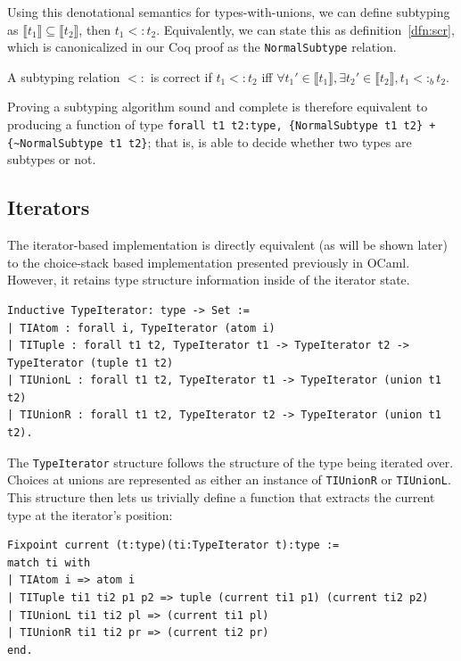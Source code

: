 \documentclass[a4paper,english]{lipics-v2018}
\newcommand{\denotes}[1]{\llbracket #1 \rrbracket}
\newcommand{\bsub}{<:_b}
\begin{document}
Using this denotational semantics for types-with-unions, we can define
subtyping as $\denotes{t_1} \subseteq \denotes{t_2}$, then $t_1 <: t_2$.
Equivalently, we can state this as definition~\ref{dfn:scr}, which is canonicalized
in our Coq proof as the \verb|NormalSubtype| relation.

\begin{definition}
A subtyping relation $<:$ is correct if $t_1 <: t_2$ iff $\forall t_1' \in \denotes{t_1},
\exists t_2' \in \denotes{t_2}, t_1 \bsub t_2$.
\label{dfn:scr}
\end{definition}

Proving a subtyping algorithm sound and complete is therefore equivalent to
producing a function of type \verb|forall t1 t2:type, {NormalSubtype t1 t2} + {~NormalSubtype t1 t2}|; that is, is able to decide whether two types are
subtypes or not.

\subsection{Iterators}

The iterator-based implementation is directly equivalent (as will be shown
later) to the choice-stack based implementation presented previously in OCaml.
However, it retains type structure information inside of the iterator state.

\begin{small}\begin{verbatim}
Inductive TypeIterator: type -> Set :=
| TIAtom : forall i, TypeIterator (atom i)
| TITuple : forall t1 t2, TypeIterator t1 -> TypeIterator t2 -> TypeIterator (tuple t1 t2)
| TIUnionL : forall t1 t2, TypeIterator t1 -> TypeIterator (union t1 t2)
| TIUnionR : forall t1 t2, TypeIterator t2 -> TypeIterator (union t1 t2).
\end{verbatim}\end{small}

The \verb|TypeIterator| structure follows the structure of the type being
iterated over. Choices at unions are represented as either an instance of
\verb|TIUnionR| or \verb|TIUnionL|. This structure then lets us trivially
define a function that extracts the current type at the iterator's position:

\begin{small}\begin{verbatim}
Fixpoint current (t:type)(ti:TypeIterator t):type :=
match ti with
| TIAtom i => atom i
| TITuple ti1 ti2 p1 p2 => tuple (current ti1 p1) (current ti2 p2)
| TIUnionL ti1 ti2 pl => (current ti1 pl)
| TIUnionR ti1 ti2 pr => (current ti2 pr)
end.
\end{verbatim}
\end{small}
\end{document}
